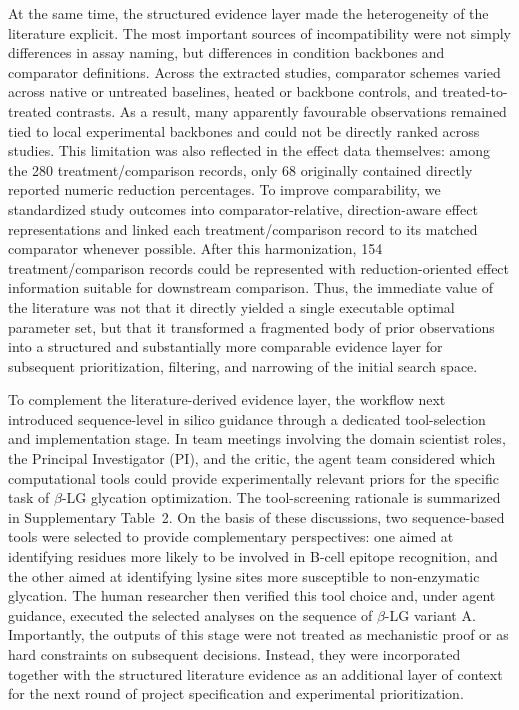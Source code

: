 At the same time, the structured evidence layer made the heterogeneity of the literature explicit. The most important sources of incompatibility were not simply differences in assay naming, but differences in condition backbones and comparator definitions. Across the extracted studies, comparator schemes varied across native or untreated baselines, heated or backbone controls, and treated-to-treated contrasts. As a result, many apparently favourable observations remained tied to local experimental backbones and could not be directly ranked across studies. This limitation was also reflected in the effect data themselves: among the 280 treatment/comparison records, only 68 originally contained directly reported numeric reduction percentages. To improve comparability, we standardized study outcomes into comparator-relative, direction-aware effect representations and linked each treatment/comparison record to its matched comparator whenever possible. After this harmonization, 154 treatment/comparison records could be represented with reduction-oriented effect information suitable for downstream comparison. Thus, the immediate value of the literature was not that it directly yielded a single executable optimal parameter set, but that it transformed a fragmented body of prior observations into a structured and substantially more comparable evidence layer for subsequent prioritization, filtering, and narrowing of the initial search space.

To complement the literature-derived evidence layer, the workflow next introduced sequence-level in silico guidance through a dedicated tool-selection and implementation stage. In team meetings involving the domain scientist roles, the Principal Investigator (PI), and the critic, the agent team considered which computational tools could provide experimentally relevant priors for the specific task of $\beta$-LG glycation optimization. The tool-screening rationale is summarized in Supplementary Table~2. On the basis of these discussions, two sequence-based tools were selected to provide complementary perspectives: one aimed at identifying residues more likely to be involved in B-cell epitope recognition, and the other aimed at identifying lysine sites more susceptible to non-enzymatic glycation. The human researcher then verified this tool choice and, under agent guidance, executed the selected analyses on the sequence of $\beta$-LG variant A. Importantly, the outputs of this stage were not treated as mechanistic proof or as hard constraints on subsequent decisions. Instead, they were incorporated together with the structured literature evidence as an additional layer of context for the next round of project specification and experimental prioritization.

